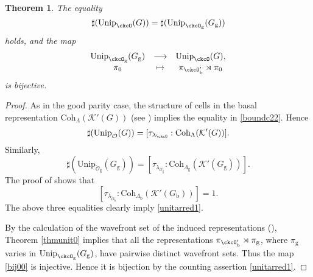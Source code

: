 \documentclass[12pt,a4paper]{amsart}
\newcommand{\CK}{{\mathcal {K}}}
\newcommand{\CO}{{\mathcal {O}}}
\newcommand{\be}{\begin {equation}}
\newcommand{\ee}{\end {equation}}
\numberwithin{equation}{section}
\newtheorem{thm}{Theorem}[section]
\theoremstyle{remark}
\def\Unip{\mathrm{Unip}}
\def\lamck{\lambda_\ckcO}
\def\Coh{\mathrm{Coh}}
\def\ckcOpb{\ckcO'_{\mathrm b}}
\def\ckcOg{\ckcO_{\mathrm g}}
\def\Gg{G_{\mathrm g}}
\begin{document}
\begin{thm}\label{thmunit012}
  The equality  \begin{equation}\label{unitarred1}
    \sharp(\Unip_{\ckcO}(G)) =
    \sharp(\Unip_{\ckcO_{\mathrm g}}(\Gg))
  \end{equation}
  holds,
  and the map
  \begin{equation}
  \label{bij00}
    \begin{array}{ccc}
      \Unip_{\ckcOg}(\Gg)&\longrightarrow &\Unip_{\ckcO}(G),\\
      \pi_{0}& \mapsto & \pi_{\ckcOpb}\rtimes \pi_{0} \\
    \end{array}
  \end{equation}
  is bijective. %
\end{thm}

\begin{proof}
 As in the good parity case,  the structure of cells in the basal representation
  $\Coh_{\Lambda}(\CK'(G))$ (see \cite[Theorem 5]{Bo}) implies
  the equality in \eqref{boundc22}. Hence
  \[
    \sharp(\Unip_{\check \CO}(G)) =[\tau_{\lamck}: \Coh_{\Lambda}(\CK'(G))].
  \]
  Similarly,
  \[
    \sharp(\Unip_{\check \CO_\mathrm g}(G_\mathrm g)) = [\tau_{\lambda_{\check \CO_\mathrm g}}: \Coh_{\Lambda_{\mathrm g}}(\CK'(G_\mathrm g))].
  \]
 The proof of  shows that
 \[
 [\tau_{\lambda_{\check \CO_\mathrm b}}:\Coh_{\Lambda_\mathrm b}(\CK'(G_\mathrm b))]=1.
 \]
  The above three equalities clearly imply \eqref{unitarred1}.

 By the  calculation of  the wavefront set of the induced representations (\cite[Corollary 5.0.10]{B.Orbit}),  Theorem \ref{thmunit0} implies that all the representations $\pi_{\ckcOpb}\rtimes \pi_{\mathrm g}$, where $\pi_\mathrm g$ varies in $\Unip_{\ckcO_{\mathrm g}}(\Gg)$, have pairwise distinct wavefront sets.   Thus the map \eqref{bij00} is injective. Hence it is bijection by the counting assertion \eqref{unitarred1}.
\end{proof}
\end{document}
